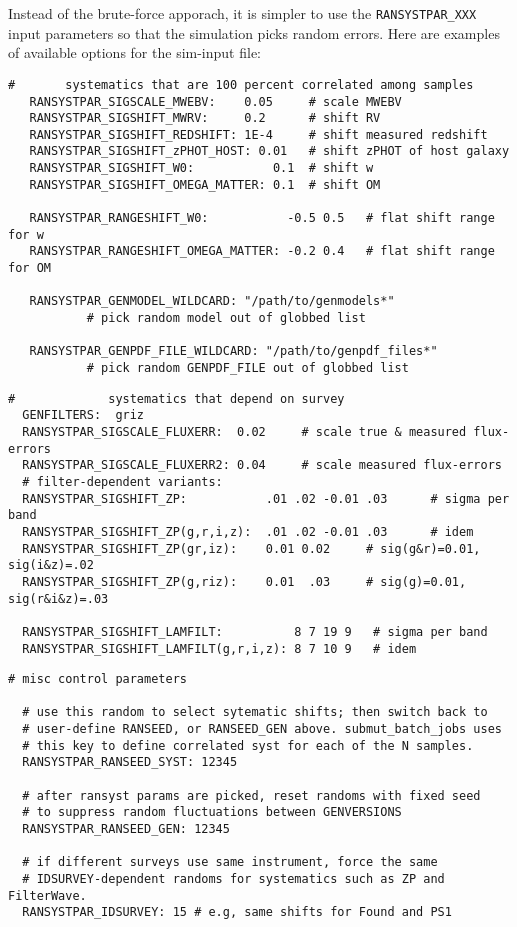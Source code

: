 \documentclass[12pt]{article}
\begin{document}
Instead of the brute-force apporach, it is simpler to use the 
{\tt RANSYSTPAR\_XXX} input parameters so that 
the simulation picks random errors.
Here are examples of available options for the sim-input file:
%
\begin{Verbatim}[frame=single]
#       systematics that are 100 percent correlated among samples
   RANSYSTPAR_SIGSCALE_MWEBV:    0.05     # scale MWEBV 
   RANSYSTPAR_SIGSHIFT_MWRV:     0.2      # shift RV
   RANSYSTPAR_SIGSHIFT_REDSHIFT: 1E-4     # shift measured redshift
   RANSYSTPAR_SIGSHIFT_zPHOT_HOST: 0.01   # shift zPHOT of host galaxy
   RANSYSTPAR_SIGSHIFT_W0:           0.1  # shift w
   RANSYSTPAR_SIGSHIFT_OMEGA_MATTER: 0.1  # shift OM

   RANSYSTPAR_RANGESHIFT_W0:           -0.5 0.5   # flat shift range for w
   RANSYSTPAR_RANGESHIFT_OMEGA_MATTER: -0.2 0.4   # flat shift range for OM

   RANSYSTPAR_GENMODEL_WILDCARD: "/path/to/genmodels*" 
           # pick random model out of globbed list

   RANSYSTPAR_GENPDF_FILE_WILDCARD: "/path/to/genpdf_files*" 
           # pick random GENPDF_FILE out of globbed list

\end{Verbatim}

\bigskip

\begin{Verbatim}[frame=single]
#             systematics that depend on survey
  GENFILTERS:  griz
  RANSYSTPAR_SIGSCALE_FLUXERR:  0.02     # scale true & measured flux-errors
  RANSYSTPAR_SIGSCALE_FLUXERR2: 0.04     # scale measured flux-errors
  # filter-dependent variants:
  RANSYSTPAR_SIGSHIFT_ZP:           .01 .02 -0.01 .03      # sigma per band
  RANSYSTPAR_SIGSHIFT_ZP(g,r,i,z):  .01 .02 -0.01 .03      # idem
  RANSYSTPAR_SIGSHIFT_ZP(gr,iz):    0.01 0.02     # sig(g&r)=0.01, sig(i&z)=.02
  RANSYSTPAR_SIGSHIFT_ZP(g,riz):    0.01  .03     # sig(g)=0.01, sig(r&i&z)=.03

  RANSYSTPAR_SIGSHIFT_LAMFILT:          8 7 19 9   # sigma per band
  RANSYSTPAR_SIGSHIFT_LAMFILT(g,r,i,z): 8 7 10 9   # idem
\end{Verbatim}

\clearpage

\begin{Verbatim}[frame=single]
  # misc control parameters

  # use this random to select sytematic shifts; then switch back to
  # user-define RANSEED, or RANSEED_GEN above. submut_batch_jobs uses
  # this key to define correlated syst for each of the N samples.
  RANSYSTPAR_RANSEED_SYST: 12345      

  # after ransyst params are picked, reset randoms with fixed seed
  # to suppress random fluctuations between GENVERSIONS
  RANSYSTPAR_RANSEED_GEN: 12345  

  # if different surveys use same instrument, force the same 
  # IDSURVEY-dependent randoms for systematics such as ZP and FilterWave.
  RANSYSTPAR_IDSURVEY: 15 # e.g, same shifts for Found and PS1
\end{Verbatim}
\end{document}
